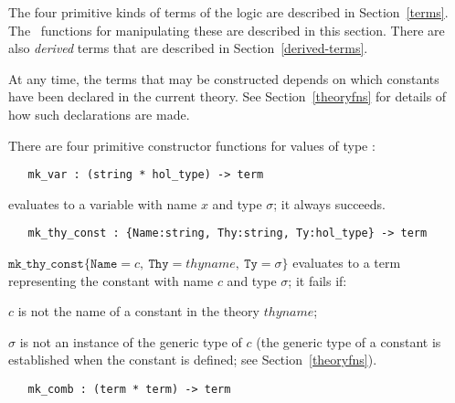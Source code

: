 The four primitive kinds of terms of the logic are described in
Section~\ref{terms}.  The \ML\ functions for manipulating these are
described in this section. There are also \emph{derived} terms that
are described in Section~\ref{derived-terms}.

At any time, the terms that may be constructed depends on which
constants have been declared in the current theory. See
Section~\ref{theoryfns} for details of how such declarations are made.

There are four primitive constructor
functions for values of type :

\begin{boxed}
\begin{verbatim}
   mk_var : (string * hol_type) -> term
\end{verbatim}
\end{boxed}

\noindent{} evaluates to a variable
with name $x$ and type $\sigma$; it always succeeds.

\begin{boxed}
\begin{verbatim}
   mk_thy_const : {Name:string, Thy:string, Ty:hol_type} -> term
\end{verbatim}
\end{boxed}

\noindent $\mathtt{mk\_thy\_const}\{\mathtt{Name} = \mathit{c},\
\mathtt{Thy} = \mathit{thyname},\ \mathtt{Ty} = \sigma\}$
 evaluates to a term representing the constant
with name $c$ and type $\sigma$; it fails if:
\begin{myenumerate}
\item $c$ is not the name of a constant in the theory $\mathit{thyname}$;
\item $\sigma$ is not an instance of the generic type of $c$
(the generic type of a constant is established when the constant is defined;
see Section~\ref{theoryfns}).
\end{myenumerate}

\begin{boxed}
\begin{verbatim}
   mk_comb : (term * term) -> term
\end{verbatim}
\end{boxed}

